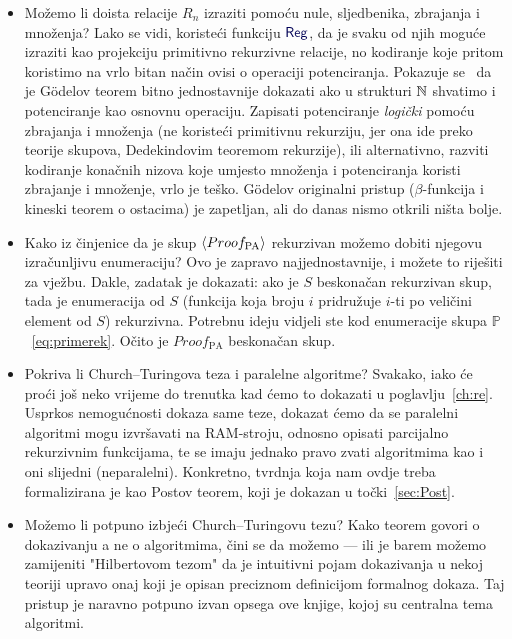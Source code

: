 \begin{itemize}
    \item Možemo li doista relacije $R_n$ izraziti pomoću nule, sljedbenika, zbrajanja i mno\-že\-nja? Lako se vidi, koristeći funkciju $\f{Reg}$, da je svaku od njih moguće izraziti kao projekciju primitivno rekurzivne relacije, no kodiranje koje pritom koristimo na vrlo bitan način ovisi o operaciji potenciranja. Pokazuje se~\cite{smullyan} da je G\"odelov teorem bitno jednostavnije dokazati ako u strukturi ${\mathbb N}$ shvatimo i potenciranje kao osnovnu operaciju. Zapisati potenciranje \emph{logički} pomoću zbrajanja i množenja (ne koristeći primitivnu rekurziju, jer ona ide preko teorije skupova, Dedekindovim teoremom rekurzije), ili alternativno, razviti kodiranje konačnih nizova koje umjesto množenja i potenciranja koristi zbrajanje i množenje, vrlo je teško. G\"odelov originalni pristup ($\beta$-funkcija i kineski teorem o ostacima) je zapetljan, ali do danas nismo otkrili ništa bolje.
    \item Kako iz činjenice da je skup $\langle Proof_{\text{PA}}\rangle$ rekurzivan možemo dobiti njegovu iz\-ra\-čun\-lji\-vu enumeraciju? Ovo je zapravo najjednostavnije, i možete to riješiti za vježbu. Dakle, zadatak je dokazati: ako je $S$ beskonačan rekurzivan skup, tada je enumeracija od $S$ (funkcija koja broju $i$ pridružuje $i$-ti po veličini element od $S$) rekurzivna. Potrebnu ideju vidjeli ste kod enumeracije skupa $\mathbb P$~\eqref{eq:primerek}. Očito je $Proof_{\text{PA}}$ beskonačan skup.
    \item Pokriva li Church--\!Turingova teza i paralelne algoritme? Svakako, iako će proći još neko vrijeme do trenutka kad ćemo to dokazati u poglavlju~\ref{ch:re}. Usprkos nemogućnosti dokaza same teze, dokazat ćemo da se paralelni algoritmi mogu izvršavati na RAM-stroju, odnosno opisati parcijalno rekurzivnim funkcijama, te se imaju jednako pravo zvati algoritmima kao i oni slijedni (neparalelni). Konkretno, tvrdnja koja nam ovdje treba formalizirana je kao Postov teorem, koji je dokazan u točki~\ref{sec:Post}.
    \item Možemo li potpuno izbjeći Church--\!Turingovu tezu? Kako teorem govori o dokazivanju a ne o algoritmima, čini se da možemo --- ili je barem možemo zamijeniti "Hilbertovom tezom" da je intuitivni pojam dokazivanja u nekoj teoriji upravo onaj koji je opisan preciznom definicijom formalnog dokaza. Taj pristup je naravno potpuno izvan opsega ove knjige, kojoj su centralna tema algoritmi.

\end{itemize}
